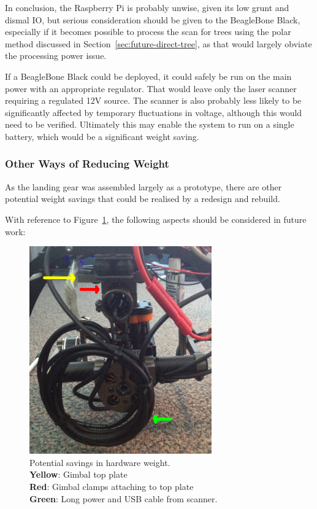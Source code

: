 \documentclass[12pt,oneside,a4paper]{book}
\begin{document}
In conclusion, the Raspberry Pi is probably unwise, given its low
grunt and dismal IO, but serious consideration should be given to the
BeagleBone Black, especially if it becomes possible to process the
scan for trees using the polar method discussed in
Section~\ref{sec:future-direct-tree}, as that would largely obviate
the processing power issue.

If a BeagleBone Black could be deployed, it could safely be run on the
main power with an appropriate regulator. That would leave only the
laser scanner requiring a regulated 12V source. The scanner is also
probably less likely to be significantly affected by temporary
fluctuations in voltage, although this would need to be verified.
Ultimately this may enable the system to run on a single battery,
which would be a significant weight saving.

\subsubsection{Other Ways of Reducing Weight}
\label{sec:other-ways-reducing}

As the landing gear was assembled largely as a prototype, there are
other potential weight savings that could be realised by a redesign
and rebuild.

With reference to Figure~\ref{fig:potential-hw-savings}, the following
aspects should be considered in future work:

\begin{figure}[h!]
  \centering
  \includegraphics[width=0.7\textwidth]{figs/potential-hw-savings}
  \caption{Potential savings in hardware weight.\\\textbf{Yellow}: Gimbal top plate\\\textbf{Red}: Gimbal clamps attaching to top plate\\\textbf{Green}: Long power and USB cable from scanner.}
  \label{fig:potential-hw-savings}
\end{figure}
\end{document}
